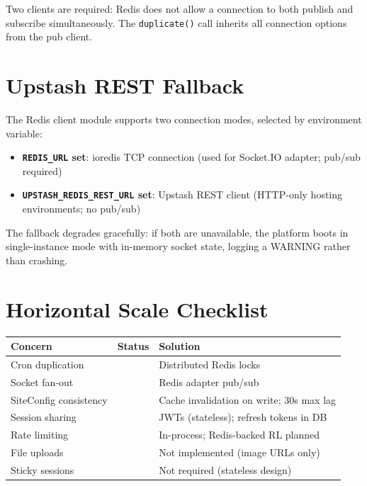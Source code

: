 \documentclass[11pt,a4paper,twoside]{book}
\newcommand{\th}[1]{\textbf{\color{white}#1}}
\newcommand{\yes}{\textcolor{ok}{\faCheckCircle}}
\newcommand{\half}{\textcolor{warn}{\faAdjust}}
\begin{document}
Two clients are required: Redis does not allow a connection to both publish and
subscribe simultaneously.  The \texttt{duplicate()} call inherits all connection
options from the pub client.

\section{Upstash REST Fallback}

The Redis client module supports two connection modes, selected by environment
variable:

\begin{itemize}[leftmargin=1.4em]
  \item \textbf{\texttt{REDIS\_URL} set}: ioredis TCP connection (used for Socket.IO adapter; pub/sub required)
  \item \textbf{\texttt{UPSTASH\_REDIS\_REST\_URL} set}: Upstash REST client (HTTP-only hosting environments; no pub/sub)
\end{itemize}

The fallback degrades gracefully: if both are unavailable, the platform boots in
single-instance mode with in-memory socket state, logging a WARNING rather than
crashing.

\section{Horizontal Scale Checklist}

\begin{center}\small
\begin{tabular}{p{5cm}lp{6cm}}
\toprule
\rowcolor{headbg}\th{Concern} & \th{Status} & \th{Solution} \\
\midrule
Cron duplication          & \yes{} & Distributed Redis locks \\
\rowcolor{rowalt}Socket fan-out            & \yes{} & Redis adapter pub/sub \\
SiteConfig consistency    & \yes{} & Cache invalidation on write; 30s max lag \\
\rowcolor{rowalt}Session sharing           & \yes{} & JWTs (stateless); refresh tokens in DB \\
Rate limiting             & \half{} & In-process; Redis-backed RL planned \\
\rowcolor{rowalt}File uploads              & \half{} & Not implemented (image URLs only) \\
Sticky sessions           & \yes{} & Not required (stateless design) \\
\bottomrule
\end{tabular}
\end{center}
\end{document}
